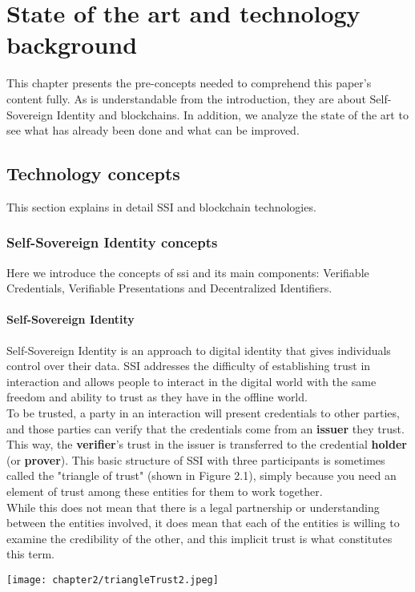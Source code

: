 
\chapter{State of the art and technology background}
This chapter presents the pre-concepts needed to comprehend this paper's content fully.
As is understandable from the introduction, they are about Self-Sovereign Identity and 
blockchains. In addition, we analyze the state of the art to see what has already been
done and what can be improved.
\section{Technology concepts}
This section explains in detail SSI and blockchain technologies.
\subsection{Self-Sovereign Identity concepts}
Here we introduce the concepts of \acrfull{ssi} and its main components:
Verifiable Credentials, Verifiable Presentations and Decentralized Identifiers.
\subsubsection{Self-Sovereign Identity}
Self-Sovereign Identity is an approach to digital identity that gives individuals 
control over their data. SSI addresses the difficulty of establishing trust in 
interaction and allows people to interact in the digital world with the same freedom 
and ability to trust as they have in the offline world.
\vspace*{0.3cm}\\
To be trusted, a party in an interaction will present credentials to other parties, 
and those parties can verify that the credentials come from an \textbf{issuer} they trust.
This way, the \textbf{verifier}'s trust in the issuer is transferred to the credential 
\textbf{holder} (or \textbf{prover}). This basic structure of SSI with three participants 
is sometimes called the "triangle of trust"\cite{site:trusttriangle} (shown in Figure 2.1),
simply because you need an element of trust among these entities for them to work 
together.
\vspace*{0.3cm}\\
While this does not mean that there is a legal partnership or understanding between the 
entities involved, it does mean that each of the entities is willing to examine the 
credibility of the other, and this implicit trust is what constitutes this term.
\begin{center}
    \texttt{[image: chapter2/triangleTrust2.jpeg]}
\end{center}
